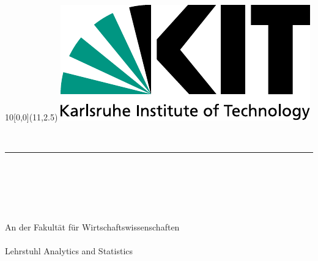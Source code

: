 
\newcommand{\diameter}{20}
\newcommand{\xone}{-15}
\newcommand{\xtwo}{160}
\newcommand{\yone}{15}
\newcommand{\ytwo}{-253}

\begin{titlepage}
	\begin{textblock}{10}[0,0](11,2.5)
		\includegraphics[width=.48\textwidth]{logos/KITLogo_EN_RGB.pdf}	\end{textblock}
	\vspace*{3.5cm}
    \begin{center}
        \Huge{\mytitle}\\
        \rule{0.05\textwidth}{0.5pt}\\
        \huge{\mytitleger}
        \vspace*{1.5cm}\\
        \Large{
            \mytype
        }\\
        \vspace*{1.5cm}
        \huge{\myname}\\
        \Large{\matricle}\\
        \vspace*{1.5cm}
        \Large{
            An der Fakultät für Wirtschaftswissenschaften\\
            \myinstitute \\
            Lehrstuhl Analytics and Statistics \\
        }
        \vspace*{1.5cm}
    \end{center}

\end{titlepage}
